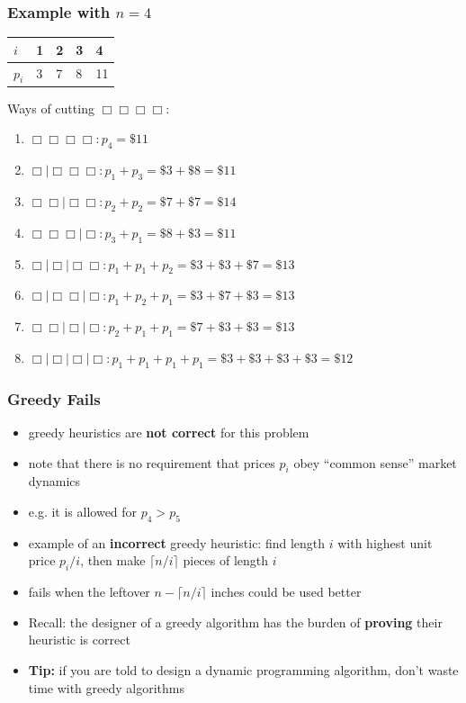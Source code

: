 \documentclass{beamer}
\begin{document}
\begin{frame} \frametitle{Example with $n=4$}
\begin{center}
  \begin{tabular}{|l|l|l|l|l|} \hline
    $i$ & 1 & 2 & 3 & 4 \\ \hline
    $p_i$ & 3 & 7 & 8 & 11 \\ \hline
  \end{tabular}
\end{center}

Ways of cutting $\Box\Box\Box\Box$:
\begin{enumerate}
  \item $\Box\Box\Box\Box : p_4 = \$ 11$
  \item $\Box \mid \Box\Box\Box : p_1 + p_3 = \$3 + \$8 = \$11$
  \item $\Box\Box \mid \Box\Box : p_2 + p_2 = \$7 + \$7 = \$14$
  \item $\Box\Box\Box \mid \Box : p_3 + p_1 = \$8 + \$3 = \$11$
  \item $\Box \mid \Box \mid \Box\Box : p_1 + p_1 + p_2 = \$3 + \$3 + \$7 = \$13$
  \item $\Box \mid \Box\Box \mid \Box : p_1 + p_2 + p_1 = \$3 + \$7 + \$3 = \$13$
  \item $\Box\Box \mid \Box \mid \Box : p_2 + p_1 + p_1 = \$7 + \$3 + \$3 = \$13$
  \item $\Box \mid \Box \mid \Box \mid \Box : p_1 + p_1 + p_1 + p_1 = \$3 + \$3 + \$3 + \$3 = \$12$
\end{enumerate}

\end{frame}

\begin{frame} \frametitle{Greedy Fails}
\begin{itemize}
  \item greedy heuristics are \textbf{not correct} for this problem
  \item note that there is no requirement that prices $p_i$ obey ``common sense'' market dynamics
  \item e.g. it is allowed for $p_4 > p_5$
  \item example of an \textbf{incorrect} greedy heuristic: find length $i$ with highest unit price $p_i/i$, then make $\lceil n/i \rceil$ pieces of length $i$
  \item fails when the leftover $n-\lceil n/i \rceil$ inches could be used better
  \item Recall: the designer of a greedy algorithm has the burden of \textbf{proving} their heuristic is correct
  \item \textbf{Tip:} if you are told to design a dynamic programming algorithm, don't waste time with greedy algorithms
\end{itemize}
\end{frame}
\end{document}
